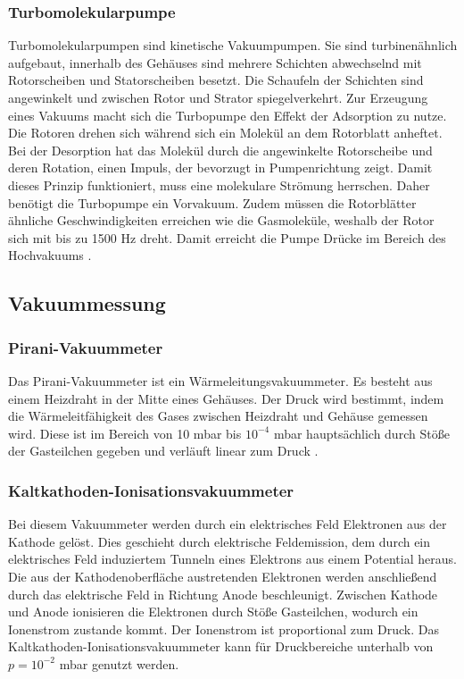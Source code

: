 \subsubsection{Turbomolekularpumpe}
Turbomolekularpumpen sind kinetische Vakuumpumpen.
Sie sind turbinenähnlich aufgebaut, innerhalb des Gehäuses sind mehrere Schichten abwechselnd mit Rotorscheiben und Statorscheiben besetzt.
Die Schaufeln der Schichten sind angewinkelt und zwischen Rotor und Strator spiegelverkehrt. 
Zur Erzeugung eines Vakuums macht sich die Turbopumpe den Effekt der Adsorption zu nutze. Die Rotoren drehen sich während sich ein Molekül an dem Rotorblatt 
anheftet. Bei der Desorption hat das Molekül durch die angewinkelte Rotorscheibe und deren Rotation, einen Impuls, der bevorzugt in Pumpenrichtung zeigt.
Damit dieses Prinzip funktioniert, muss eine molekulare Strömung herrschen. Daher benötigt die Turbopumpe ein Vorvakuum. Zudem müssen die Rotorblätter ähnliche Geschwindigkeiten 
erreichen wie die Gasmoleküle, weshalb der Rotor sich mit bis zu 1500 Hz dreht.
Damit erreicht die Pumpe Drücke im Bereich des Hochvakuums \cite{Pfeiffer, S.83,84}.


\subsection{Vakuummessung}
\subsubsection{Pirani-Vakuummeter}
Das Pirani-Vakuummeter ist ein Wärmeleitungsvakuummeter. Es besteht aus einem Heizdraht in der Mitte eines Gehäuses.
Der Druck wird bestimmt, indem die Wärmeleitfähigkeit des Gases zwischen Heizdraht und Gehäuse gemessen wird. 
Diese ist im Bereich von 10 mbar bis $10^{-4}$ mbar hauptsächlich durch Stöße der Gasteilchen gegeben und verläuft linear zum Druck \cite{Pfeiffer, S.93,94}.


\subsubsection{Kaltkathoden-Ionisationsvakuummeter}
Bei diesem Vakuummeter werden durch ein elektrisches Feld Elektronen aus der Kathode gelöst.
Dies geschieht durch elektrische Feldemission, dem durch ein elektrisches Feld induziertem Tunneln eines Elektrons aus einem Potential heraus.
Die aus der Kathodenoberfläche austretenden Elektronen werden anschließend durch das elektrische Feld in Richtung Anode beschleunigt.
Zwischen Kathode und Anode ionisieren die Elektronen durch Stöße Gasteilchen, wodurch ein Ionenstrom zustande kommt.
Der Ionenstrom ist proportional zum Druck.
Das Kaltkathoden-Ionisationsvakuummeter kann für Druckbereiche unterhalb von $p = 10^{-2}$ mbar genutzt werden\cite{Pfeiffer, S.94}.

